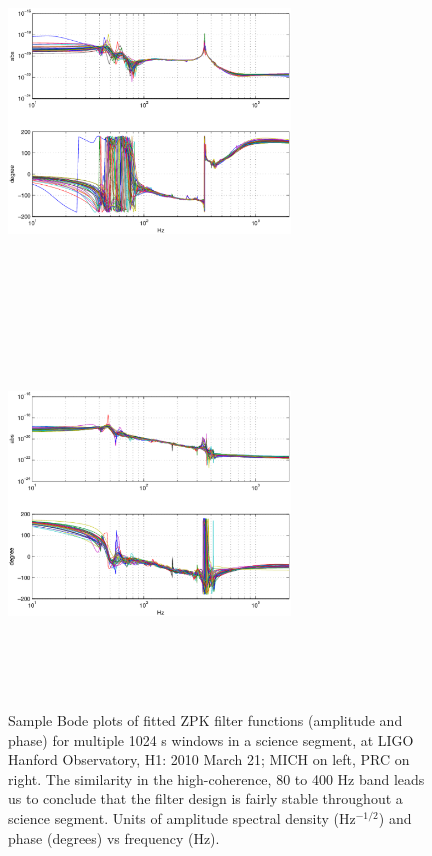 \begin{figure}
\begin{center}
\includegraphics[height=100mm, width=75mm]{figure4a.eps}
\includegraphics[height=100mm, width=75mm]{figure4b.eps}
\caption{Sample Bode plots of fitted ZPK filter functions (amplitude and phase) for multiple 1024 s windows in a science segment, at LIGO Hanford Observatory, H1: 2010 March 21; MICH on left, PRC on right. The similarity in the high-coherence, 80 to 400 Hz band leads us to conclude that the filter design is fairly stable throughout a science segment. Units of amplitude spectral density (Hz$^{-1/2}$) and phase (degrees) vs frequency (Hz).}
\label{BodePlots}
\end{center}
\end{figure}
